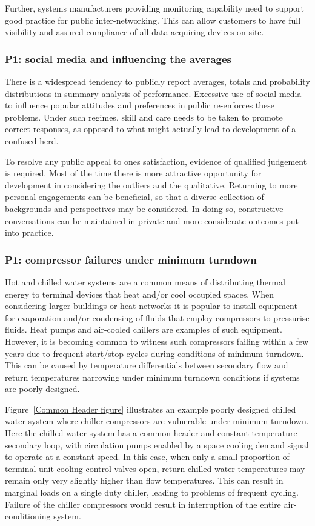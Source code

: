 \documentclass[11pt, oneside]{book}   	%
\begin{document}
Further, systems manufacturers providing monitoring capability need to support good practice for public inter-networking.
This can allow customers to have full visibility and assured compliance of all data acquiring devices on-site.\

\subsubsection{P1: social media and influencing the averages}
There is a widespread tendency to publicly report averages, totals and probability distributions in summary analysis of performance.
Excessive use of social media to influence popular attitudes and preferences in public re-enforces these problems.
Under such regimes, skill and care needs to be taken to promote correct responses, as opposed to what might actually lead to development of a confused herd.\

To resolve any public appeal to ones satisfaction, evidence of qualified judgement is required.
Most of the time there is more attractive opportunity for development in considering the outliers and the qualitative.
Returning to more personal engagements can be beneficial, so that a diverse collection of backgrounds and perspectives may be considered.
In doing so, constructive conversations can be maintained in private and more considerate outcomes put into practice.\

\subsubsection{P1: compressor failures under minimum turndown}
Hot and chilled water systems are a common means of distributing thermal energy to terminal devices that heat and/or cool occupied spaces.
When considering larger buildings or heat networks it is popular to install equipment for evaporation and/or condensing of fluids that employ compressors to pressurise fluids.
Heat pumps and air-cooled chillers are examples of such equipment.
However, it is becoming common to witness such compressors failing within a few years due to frequent start/stop cycles during conditions of minimum turndown.
This can be caused by temperature differentials between secondary flow and return temperatures narrowing under minimum turndown conditions if systems are poorly designed.\

Figure~\ref{Common Header figure} illustrates an example poorly designed chilled water system where chiller compressors are vulnerable under minimum turndown.
Here the chilled water system has a common header and constant temperature secondary loop, with circulation pumps enabled by a space cooling demand signal to operate at a constant speed.
In this case, when only a small proportion of terminal unit cooling control valves open, return chilled water temperatures may remain only very slightly higher than flow temperatures.
This can result in marginal loads on a single duty chiller, leading to problems of frequent cycling.
Failure of the chiller compressors would result in interruption of the entire air-conditioning system.\
\end{document}
